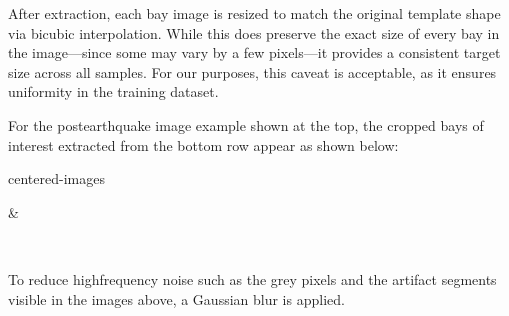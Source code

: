 \documentclass[letterpaper,10pt,english]{sphinxmanual}
\begin{document}
\sphinxAtStartPar
After extraction, each bay image is resized to match the original template
shape via bicubic interpolation.
While this does  preserve the exact size of every bay in the image—since
some may vary by a few pixels—it provides a consistent target size across all
samples.
For our purposes, this caveat is acceptable, as it ensures uniformity in the
training dataset.

\sphinxAtStartPar
For the post\sphinxhyphen{}earthquake image example shown at the top, the cropped bays of
interest extracted from the bottom row appear as shown below:

\begin{sphinxuseclass}{centered-images}

\begin{savenotes}\sphinxattablestart
\sphinxthistablewithglobalstyle
\centering
\begin{tabular}[t]{}
\sphinxtoprule
\sphinxtableatstartofbodyhook

\begin{sphinxfigure-in-table}
\centering
\capstart
\noindent{}
\label{\detokenize{data:id12}}\end{sphinxfigure-in-table}\relax
&

\begin{sphinxfigure-in-table}
\centering
\capstart
\noindent{}
\label{\detokenize{data:id13}}\end{sphinxfigure-in-table}\relax
\\
\sphinxbottomrule
\end{tabular}
\sphinxtableafterendhook\par
\sphinxattableend\end{savenotes}

\end{sphinxuseclass}
\sphinxAtStartPar
To reduce high\sphinxhyphen{}frequency noise such as the grey pixels and the artifact segments
visible in the images above, a Gaussian blur is applied.
\end{document}

